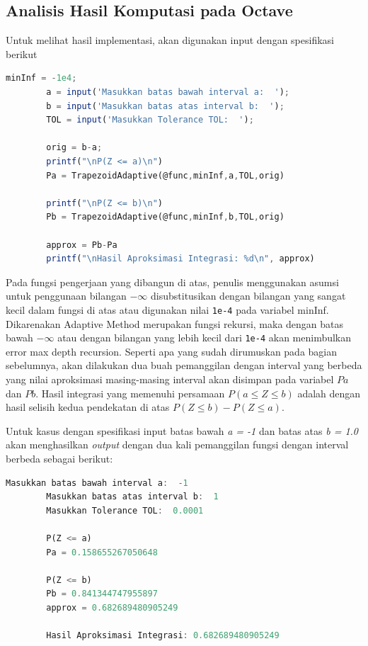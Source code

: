 \documentclass[journal,12pt,onecolumn,a4paper]{IEEEtran}
\begin{document}
\subsection{Analisis Hasil Komputasi pada Octave}

Untuk melihat hasil implementasi, akan digunakan input dengan spesifikasi berikut

\begin{center}
	\begin{lstlisting}[language=Octave]
		minInf = -1e4;
		a = input('Masukkan batas bawah interval a:  ');
		b = input('Masukkan batas atas interval b:  ');
		TOL = input('Masukkan Tolerance TOL:  ');

		orig = b-a;
		printf("\nP(Z <= a)\n")
		Pa = TrapezoidAdaptive(@func,minInf,a,TOL,orig)

		printf("\nP(Z <= b)\n")
		Pb = TrapezoidAdaptive(@func,minInf,b,TOL,orig)

		approx = Pb-Pa
		printf("\nHasil Aproksimasi Integrasi: %d\n", approx)
	\end{lstlisting}
\end{center}

Pada fungsi pengerjaan yang dibangun di atas, penulis menggunakan asumsi untuk penggunaan bilangan \(-\infty\) disubstitusikan dengan bilangan yang sangat kecil dalam fungsi di atas atau digunakan nilai \lstinline{1e-4} pada variabel minInf. Dikarenakan Adaptive Method merupakan fungsi rekursi, maka dengan batas bawah \(-\infty\) atau dengan bilangan yang lebih kecil dari \lstinline{1e-4} akan menimbulkan error max depth recursion.
Seperti apa yang sudah dirumuskan pada bagian sebelumnya, akan dilakukan dua buah pemanggilan dengan interval yang berbeda yang nilai aproksimasi masing-masing interval akan disimpan pada variabel \(Pa\) dan \(Pb\). Hasil integrasi yang memenuhi persamaan \(P(a \le Z \le b)\) adalah dengan hasil selisih kedua pendekatan di atas \(P(Z \le b ) - P(Z \le a )\).

Untuk kasus dengan spesifikasi input batas bawah \emph{a = -1} dan batas atas \emph{b = 1.0} akan menghasilkan \emph{output} dengan dua kali pemanggilan fungsi dengan interval berbeda sebagai berikut:

\begin{center}
	\begin{lstlisting}[language=Octave]
		Masukkan batas bawah interval a:  -1
		Masukkan batas atas interval b:  1
		Masukkan Tolerance TOL:  0.0001

		P(Z <= a)
		Pa = 0.158655267050648

		P(Z <= b)
		Pb = 0.841344747955897
		approx = 0.682689480905249

		Hasil Aproksimasi Integrasi: 0.682689480905249

	\end{lstlisting}
\end{center}
\end{document}
